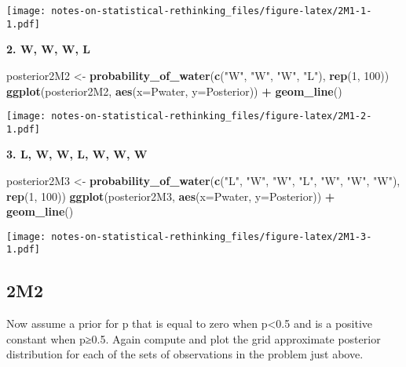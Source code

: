\documentclass[
]{book}
\newenvironment{Shaded}{\begin{snugshade}}{\end{snugshade}}
\newcommand{\DataTypeTok}[1]{\textcolor[rgb]{0.13,0.29,0.53}{#1}}
\newcommand{\DecValTok}[1]{\textcolor[rgb]{0.00,0.00,0.81}{#1}}
\newcommand{\KeywordTok}[1]{\textcolor[rgb]{0.13,0.29,0.53}{\textbf{#1}}}
\newcommand{\NormalTok}[1]{#1}
\newcommand{\OperatorTok}[1]{\textcolor[rgb]{0.81,0.36,0.00}{\textbf{#1}}}
\newcommand{\StringTok}[1]{\textcolor[rgb]{0.31,0.60,0.02}{#1}}
\begin{document}
\texttt{[image: notes-on-statistical-rethinking\_files/figure-latex/2M1-1-1.pdf]}

\textbf{2. W, W, W, L}

\begin{Shaded}
\begin{Highlighting}[]
\NormalTok{posterior2M2 \textless{}{-}}\StringTok{ }\KeywordTok{probability\_of\_water}\NormalTok{(}\KeywordTok{c}\NormalTok{(}\StringTok{"W"}\NormalTok{, }\StringTok{"W"}\NormalTok{, }\StringTok{"W"}\NormalTok{, }\StringTok{"L"}\NormalTok{), }\KeywordTok{rep}\NormalTok{(}\DecValTok{1}\NormalTok{, }\DecValTok{100}\NormalTok{))}
\KeywordTok{ggplot}\NormalTok{(posterior2M2, }\KeywordTok{aes}\NormalTok{(}\DataTypeTok{x=}\NormalTok{Pwater, }\DataTypeTok{y=}\NormalTok{Posterior)) }\OperatorTok{+}\StringTok{ }
\StringTok{  }\KeywordTok{geom\_line}\NormalTok{()}
\end{Highlighting}
\end{Shaded}

\texttt{[image: notes-on-statistical-rethinking\_files/figure-latex/2M1-2-1.pdf]}

\textbf{3. L, W, W, L, W, W, W}

\begin{Shaded}
\begin{Highlighting}[]
\NormalTok{posterior2M3 \textless{}{-}}\StringTok{ }\KeywordTok{probability\_of\_water}\NormalTok{(}\KeywordTok{c}\NormalTok{(}\StringTok{"L"}\NormalTok{, }\StringTok{"W"}\NormalTok{, }\StringTok{"W"}\NormalTok{, }\StringTok{"L"}\NormalTok{, }\StringTok{"W"}\NormalTok{, }\StringTok{"W"}\NormalTok{, }\StringTok{"W"}\NormalTok{), }\KeywordTok{rep}\NormalTok{(}\DecValTok{1}\NormalTok{, }\DecValTok{100}\NormalTok{))}
\KeywordTok{ggplot}\NormalTok{(posterior2M3, }\KeywordTok{aes}\NormalTok{(}\DataTypeTok{x=}\NormalTok{Pwater, }\DataTypeTok{y=}\NormalTok{Posterior)) }\OperatorTok{+}\StringTok{ }
\StringTok{  }\KeywordTok{geom\_line}\NormalTok{()}
\end{Highlighting}
\end{Shaded}

\texttt{[image: notes-on-statistical-rethinking\_files/figure-latex/2M1-3-1.pdf]}

\hypertarget{m2}{%
\subsection*{2M2}\label{m2}}

Now assume a prior for p that is equal to zero when p\textless0.5 and is a positive constant when p≥0.5. Again compute and plot the grid approximate posterior distribution for each of the sets of observations in the problem just above.
\end{document}
